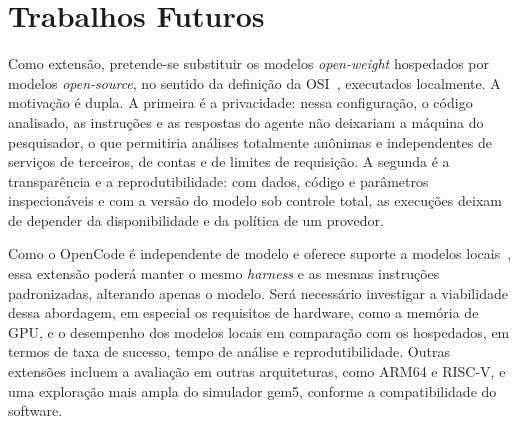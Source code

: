 \documentclass[12pt]{article}
\begin{document}

\section{Trabalhos Futuros}
\label{sec:futuros}

Como extensão, pretende-se substituir os modelos \textit{open-weight} hospedados por modelos \textit{open-source}, no sentido da definição da OSI~\cite{osi2024osaid}, executados localmente. A motivação é dupla. A primeira é a privacidade: nessa configuração, o código analisado, as instruções e as respostas do agente não deixariam a máquina do pesquisador, o que permitiria análises totalmente anônimas e independentes de serviços de terceiros, de contas e de limites de requisição. A segunda é a transparência e a reprodutibilidade: com dados, código e parâmetros inspecionáveis e com a versão do modelo sob controle total, as execuções deixam de depender da disponibilidade e da política de um provedor.

Como o OpenCode é independente de modelo e oferece suporte a modelos locais~\cite{opencode2026}, essa extensão poderá manter o mesmo \textit{harness} e as mesmas instruções padronizadas, alterando apenas o modelo. Será necessário investigar a viabilidade dessa abordagem, em especial os requisitos de hardware, como a memória de GPU, e o desempenho dos modelos locais em comparação com os hospedados, em termos de taxa de sucesso, tempo de análise e reprodutibilidade. Outras extensões incluem a avaliação em outras arquiteturas, como ARM64 e RISC-V, e uma exploração mais ampla do simulador gem5, conforme a compatibilidade do software.






\end{document}
